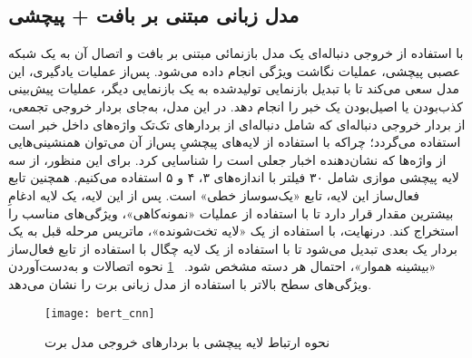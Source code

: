 
\subsection{مدل زبانی مبتنی بر بافت + پیچشی}
با استفاده از خروجی دنباله‌ای یک مدل‌ بازنمائی مبتنی بر بافت و اتصال آن به یک شبکه عصبی پیچشی، عملیات نگاشت ویژگی انجام داده می‌شود. پس‌از عملیات یادگیری، این مدل سعی می‌کند تا با تبدیل بازنمایی تولیدشده به یک بازنمایی دیگر، عملیات پیش‌بینی کذب‌بودن یا اصیل‌بودن یک خبر را انجام دهد. در این مدل، به‌جای بردار خروجی تجمعی، از بردار خروجی دنباله‌ای که شامل دنباله‌ای از بردارهای تک‌تک واژه‌های داخل خبر است استفاده می‌گردد؛ چراکه با استفاده از لایه‌های پیچشیِ پس‌از آن می‌توان همنشینی‌هایی از واژه‌ها که نشان‌دهنده اخبار جعلی است را شناسایی کرد. برای این منظور، از سه لایه پیچشی موازی شامل ۳۰ فیلتر با اندازه‌های ۳، ۴ و ۵ استفاده می‌کنیم. همچنین تابع فعال‌ساز این لایه، تابع «یک‌سوساز خطی» است. پس از این لایه، یک لایه ادغامِ بیشترین مقدار قرار دارد تا با استفاده از عملیات «نمونه‌کاهی»، ویژگی‌های مناسب را استخراج کند. درنهایت، با استفاده از یک «لایه تخت‌شونده»، ماتریس مرحله قبل به یک بردار یک بعدی تبدیل می‌شود تا با استفاده از یک لایه چگال با استفاده از تابع فعال‌ساز «بیشینه هموار»، احتمال هر دسته مشخص شود. \figurename~\ref{fig.bertCNN} نحوه اتصالات و به‌دست‌آوردن ویژگی‌های سطح بالاتر با استفاده از مدل زبانی برت را نشان می‌دهد.

\begin{figure}[!h]
\texttt{[image: bert\_cnn]}
\centering
\caption{نحوه ارتباط لایه پیچشی با بردارهای خروجی مدل برت}
\label{fig.bertCNN}
\end{figure}
